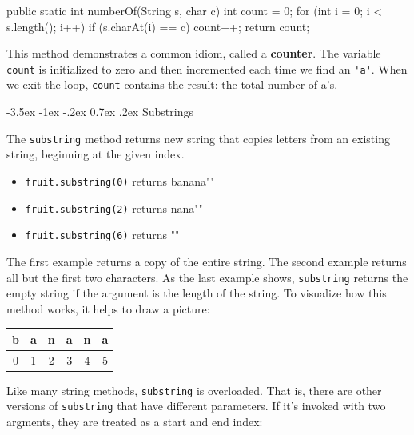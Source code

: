 \documentclass[12pt]{book}
\makeatletter
\theoremstyle{exercise}
\newcommand{\java}[1]{\verb"#1"}
\renewcommand{\section}{\@startsection{section}{1}{\z@}%
    {-3.5ex \@plus -1ex \@minus -.2ex}%
    {0.7ex \@plus.2ex}%
    {\normalfont\Large\bfseries}}
\newcommand{\java}[1]{\lstinline{#1}} %
\makeatother
\begin{document}
\begin{code}
    public static int numberOf(String s, char c) {
        int count = 0;
        for (int i = 0; i < s.length(); i++) {
            if (s.charAt(i) == c) {
                count++;
            }
        }
        return count;
    }
\end{code}


This method demonstrates a common idiom, called a {\bf counter}.
The variable \java{count} is initialized to zero and then incremented each time we find an \java{'a'}.
When we exit the loop, \java{count} contains the result: the total number of a's.


\section{Substrings}

The \java{substring} method returns new string that copies letters from an existing string, beginning at the given index.

\begin{itemize}
\item \java{fruit.substring(0)} returns \java{"banana"}
\item \java{fruit.substring(2)} returns \java{"nana"}
\item \java{fruit.substring(6)} returns \java{""}
\end{itemize}

The first example returns a copy of the entire string.
The second example returns all but the first two characters.
As the last example shows, \java{substring} returns the empty string if the argument is the length of the string.
To visualize how this method works, it helps to draw a picture:


\begin{center}
\begin{tabular}{|c|c|c|c|c|c|}
\hline
b & a & n & a & n & a \\
\hline
0 & 1 & 2 & 3 & 4 & 5 \\
\hline
\end{tabular}
\end{center}

Like many string methods, \java{substring} is overloaded.
That is, there are other versions of \java{substring} that have different parameters.
If it's invoked with two argments, they are treated as a start and end index:
\end{document}
